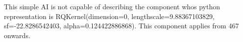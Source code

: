 This simple AI is not capable of describing the component whos python representation is RQKernel(dimension=0, lengthscale=9.88367103829, sf=-22.8286542403, alpha=0.124422886868).
This component applies from  467 onwards.